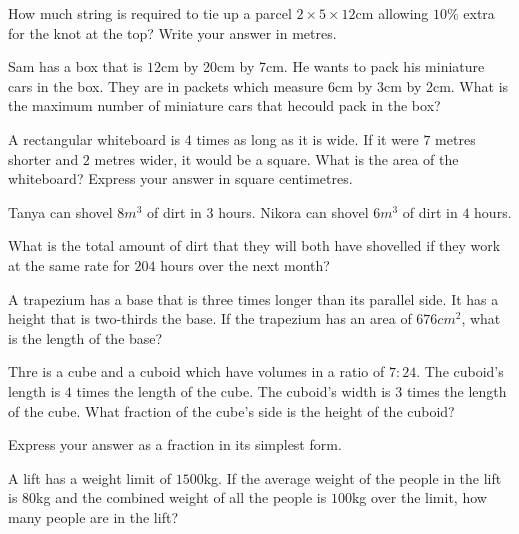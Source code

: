 \documentclass{article}
\theoremstyle{mytheoremstyle}
\theoremstyle{mytheoremstyle}
\theoremstyle{myproblemstyle}
\begin{document}
    \begin{problem}
        How much string is required to tie up a parcel $2\times5\times12$cm allowing $10\%$ extra for the knot at the top? Write your answer in metres.
    \end{problem}

    \begin{problem}
        Sam has a box that is $12$cm by 20cm by 7cm. He wants to pack his miniature cars in the box. They are in packets which measure $6$cm by 3cm by 2cm. What is the maximum number of miniature cars that hecould pack in the box?
    \end{problem}

    \begin{problem}
        A rectangular whiteboard is $4$ times as long as it is wide. If it were $7$ metres shorter and $2$ metres wider, it would be a square. What is the area of the whiteboard? Express your answer in square centimetres.
    \end{problem}

    \begin{problem}
        Tanya can shovel $8m^3$ of dirt in $3$ hours. Nikora can shovel $6m^3$ of dirt in $4$ hours. 
        
        What is the total amount of dirt that they will both have shovelled if they work at the same rate for $204$ hours over the next month?
    \end{problem}

    \begin{problem}
        A trapezium has a base that is three times longer than its parallel side. It has a height that is two-thirds the base. If the trapezium has an area of $676cm^2$, what is the length of the base?
    \end{problem}

    \begin{problem}
        Thre is a cube and a cuboid which have volumes in a ratio of $7:24$. The cuboid's length is $4$ times the length of the cube. The cuboid's width is $3$ times the length of the cube. What fraction of the cube's side is the height of the cuboid?

        Express your answer as a fraction in its simplest form.
    \end{problem}

    \begin{problem}
        A lift has a weight limit of $1500$kg. If the average weight of the people in the lift is $80$kg and the combined weight of all the people is $100$kg over the limit, how many people are in the lift?
    \end{problem}
\end{document}
